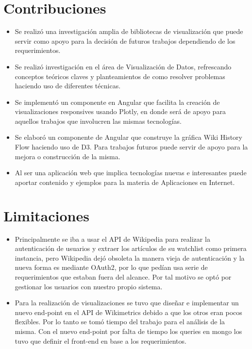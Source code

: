 \section{Contribuciones}
\begin{itemize}
    \item Se realizó una investigación amplia de bibliotecas de visualización que puede servir como apoyo para la decisión de futuros trabajos dependiendo de los requerimientos.
    
    \item Se realizó investigación en el área de Visualización de Datos, refrescando conceptos teóricos claves y planteamientos de como resolver problemas haciendo uso de diferentes técnicas.
    
    \item Se implementó un componente en Angular que facilita la creación de visualizaciones responsives usando Plotly, en donde será de apoyo para aquellos trabajos que involucren las mismas tecnologías.
    
    \item Se elaboró un componente de Angular que construye la gráfica Wiki History Flow haciendo uso de D3. Para trabajos futuros puede servir de apoyo para la mejora o construcción de la misma.
    
    \item Al ser una aplicación web que implica tecnologías nuevas e interesantes puede aportar contenido y ejemplos para la materia de Aplicaciones en Internet.
\end{itemize}

\section{Limitaciones}

\begin{itemize}
    \item Principalmente se iba a usar el API de Wikipedia para realizar la autenticación de usuarios y extraer los artículos de su watchlist como primera instancia, pero Wikipedia dejó obsoleta la manera vieja de autenticación y la nueva forma es mediante OAuth2, por lo que pedían usa serie de requerimientos que estaban fuera del alcance. Por tal motivo se optó por gestionar los usuarios con nuestro propio sistema.
    
    \item Para la realización de visualizaciones se tuvo que diseñar e implementar un nuevo end-point en el API de Wikimetrics debido a que los otros eran pocos flexibles. Por lo tanto se tomó tiempo del trabajo para el análisis de la misma. Con el nuevo end-point por falta de tiempo los queries en mongo los tuvo que definir el front-end en base a los requerimientos.
\end{itemize}

